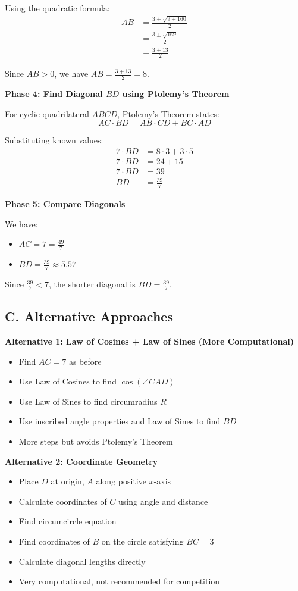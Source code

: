 \documentclass[11pt]{article}
\begin{document}
\begin{techniquesbox}
Using the quadratic formula:
\begin{align*}
AB &= \frac{3 \pm \sqrt{9 + 160}}{2} \\
&= \frac{3 \pm \sqrt{169}}{2} \\
&= \frac{3 \pm 13}{2}
\end{align*}

Since $AB > 0$, we have $AB = \frac{3 + 13}{2} = 8$.

\textbf{Phase 4: Find Diagonal $BD$ using Ptolemy's Theorem}

For cyclic quadrilateral $ABCD$, Ptolemy's Theorem states:
\[AC \cdot BD = AB \cdot CD + BC \cdot AD\]

Substituting known values:
\begin{align*}
7 \cdot BD &= 8 \cdot 3 + 3 \cdot 5 \\
7 \cdot BD &= 24 + 15 \\
7 \cdot BD &= 39 \\
BD &= \frac{39}{7}
\end{align*}

\textbf{Phase 5: Compare Diagonals}

We have:
\begin{itemize}
    \item $AC = 7 = \frac{49}{7}$
    \item $BD = \frac{39}{7} \approx 5.57$
\end{itemize}

Since $\frac{39}{7} < 7$, the shorter diagonal is $BD = \frac{39}{7}$.

\subsection*{C. Alternative Approaches}

\textbf{Alternative 1: Law of Cosines + Law of Sines (More Computational)}
\begin{itemize}
    \item Find $AC = 7$ as before
    \item Use Law of Cosines to find $\cos(\angle CAD)$
    \item Use Law of Sines to find circumradius $R$
    \item Use inscribed angle properties and Law of Sines to find $BD$
    \item More steps but avoids Ptolemy's Theorem
\end{itemize}

\textbf{Alternative 2: Coordinate Geometry}
\begin{itemize}
    \item Place $D$ at origin, $A$ along positive $x$-axis
    \item Calculate coordinates of $C$ using angle and distance
    \item Find circumcircle equation
    \item Find coordinates of $B$ on the circle satisfying $BC = 3$
    \item Calculate diagonal lengths directly
    \item Very computational, not recommended for competition
\end{itemize}


\end{techniquesbox}
\end{document}

